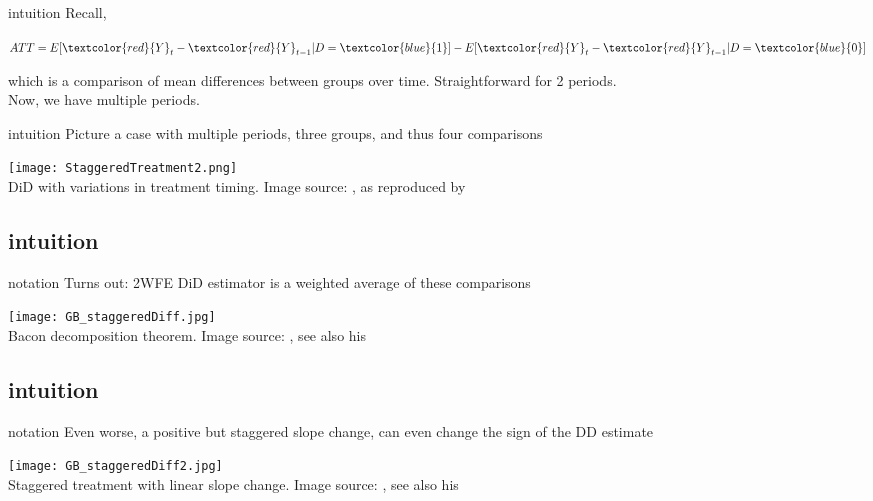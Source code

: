 \documentclass[aspectratio=169]{beamer}
\begin{document}
		\begin{frame}{intuition}
			Recall,
			\\ \vspace*{.25cm}
			\begin{center}
				\begin{math}
					ATT=E[\textcolor{red}{Y}_t - \textcolor{red}{Y}_{t-1}|D=\textcolor{blue}{1}] - E[\textcolor{red}{Y}_t-\textcolor{red}{Y}_{t-1}|D=\textcolor{blue}{0}]
				\end{math}
			\end{center}
			which is a comparison of mean differences between groups over time. Straightforward for 2 periods.
			\\ \vspace*{.25cm}
			Now, we have multiple periods.
		\end{frame}

		\begin{frame}{intuition}
			Picture a case with multiple periods, three groups, and thus four comparisons
			\begin{center}
				\texttt{[image: StaggeredTreatment2.png]}
				\\ \tiny{DiD with variations in treatment timing. Image source: \cite{Goodman-Bacon2018}, as reproduced by \href{https://andrewcbaker.netlify.app/2019/09/25/difference-in-differences-methodology/}{\underline{}}}
			\end{center}
		\end{frame}

	\subsection{intuition}
		\begin{frame}{notation}
			Turns out: 2WFE DiD estimator is a weighted average of these comparisons
			\begin{center}
				\texttt{[image: GB\_staggeredDiff.jpg]}
				\\ \tiny{Bacon decomposition theorem. Image source: \cite{Goodman-Bacon2018}, see also his  \href{https://twitter.com/agoodmanbacon/status/1039126592604303360}{\underline{}}}
			\end{center}
		\end{frame}

		\subsection{intuition}
			\begin{frame}{notation}
				Even worse, a positive but staggered slope change, can even change the sign of the DD estimate
				\begin{center}
					\texttt{[image: GB\_staggeredDiff2.jpg]}
					\\ \tiny{Staggered treatment with linear slope change. Image source: \cite{Goodman-Bacon2018}, see also his  \href{https://twitter.com/agoodmanbacon/status/1039126592604303360}{\underline{}}}
				\end{center}
			\end{frame}
\end{document}
